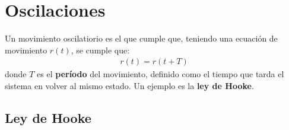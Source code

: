 \documentclass{article}
\begin{document}
\section{Oscilaciones}
Un movimiento oscilatiorio es el que cumple que, teniendo una ecuación de movimiento $r(t)$,
se cumple que:
\begin{equation}
    \begin{split}
        r(t) = r(t + T)
    \end{split}
\end{equation}
donde $T$ es el \textbf{período} del movimiento, definido como el tiempo que tarda el sistema
en volver al mismo estado. Un ejemplo es la \textbf{ley de Hooke}.
\subsection{Ley de Hooke}
\end{document}
